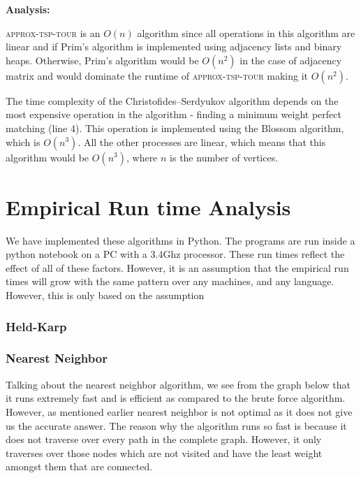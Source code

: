 \documentclass[12pt]{report}
\begin{document}
  \textbf{Analysis:} \par
  \textsc{approx-tsp-tour} is an $O(n)$ algorithm since all operations in this algorithm are linear and if Prim's algorithm is 
  implemented using adjacency lists and binary heaps. Otherwise, Prim's algorithm would be $O(n^2)$ in the 
  case of adjacency matrix and would dominate the runtime of \textsc{approx-tsp-tour} making it $O(n^2)$.
  \par The time complexity of the Christofides–Serdyukov algorithm depends on the most expensive operation in the 
  algorithm - finding a minimum weight perfect matching (line 4). This operation is implemented using the Blossom algorithm, which is $O(n^3)$. All the other 
  processes are linear, which means that this algorithm would be $O(n^3)$, where $n$ is the number of vertices. 





\chapter{Empirical Run time Analysis}
We have implemented these algorithms in Python. The programs are run inside a python notebook on a PC with a 3.4Ghz processor. These run times reflect the effect of all of these factors. However, it is an assumption that the empirical run times will grow with the same pattern over any machines, and any language. However, this is only based on the assumption 

\subsection{Held-Karp}
\subsection{Nearest Neighbor}

Talking about the nearest neighbor algorithm, we see from the graph below that it runs extremely fast and is efficient as compared to the brute force algorithm. However, as mentioned earlier nearest neighbor is not optimal as it does not give us the accurate answer. The reason why the algorithm runs so fast is because it does not traverse over every path in the complete graph. However, it only traverses over those nodes which are not visited and have the least weight amongst them that are connected.
\end{document}
